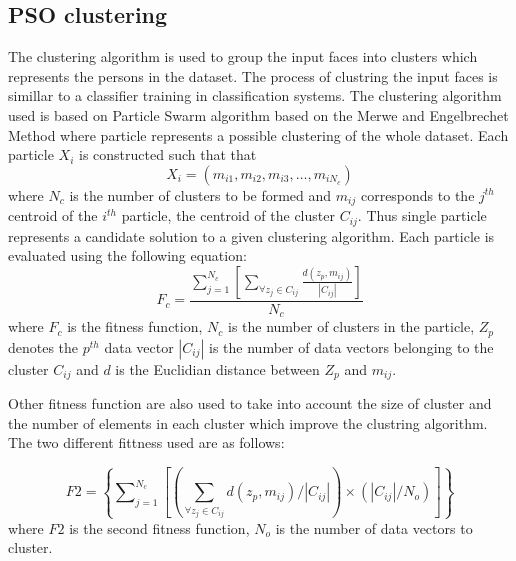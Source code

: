 \documentclass[a4paper,twoside]{article}
\begin{document}
\subsection{PSO clustering}
\label{sec:psoClustering}

The clustering algorithm is used to group the input faces into clusters which represents the persons in the dataset. The process of clustring the input faces is simillar to a classifier training in classification systems.    The clustering algorithm used is based on Particle Swarm algorithm  based on the Merwe and Engelbrechet \cite{psoclustering} Method where particle represents a possible clustering of the whole dataset.  Each particle $X_i$ is constructed such that that
\begin{equation}
X_i=\left( m_{i1}, m_{i2}, m_{i3},\dots, m_{iN_c}\right)
\end{equation}
where $N_c$ is the number of clusters to be formed and $m_{ij}$ corresponds to the $j^{th}$ centroid of the  $i^{th}$ particle, the centroid of the cluster $C_{ij}$. Thus single particle represents a candidate solution to a given clustering algorithm. Each particle is evaluated using the following equation:
\begin{equation}
F_c  = \frac{{\sum\nolimits_{j = 1}^{N_c } {\left[ {\sum\limits_{\forall z_j  \in C_{ij} } {\frac{{d(z_p ,m_{ij} )}}{{\left| {C_{ij} } \right|}}} } \right]} }}{{N_c }}
\end{equation}
where $F_c$ is the fitness function, $N_c$ is the number of clusters in the particle, $Z_p$ denotes the $p^{th}$ data vector $\left| {C_{ij} } \right|$ is the number of data vectors belonging to the cluster $C_{ij}$ and $d$ is the Euclidian distance between $Z_p$ and $m_{ij}$.

Other fitness function are also used to take into account the size of cluster and the number of elements in each cluster which improve the clustring algorithm. The two different fittness used are as follows:

\begin{equation}
F2 =  \left\{ \sum\nolimits_{j=1}^{N_c} \left[ \left( \sum\limits_{\forall z_j \in C_{ij}} d(z_p ,m_{ij} )/\left|{C_{ij} }\right| \right) \times  \left(  \left|{C_{ij} }\right| /N_o\right)\right]\right\}  
\end{equation}
where $F2$ is the second fitness function, $N_o$ is the number of data vectors to cluster.
\end{document}
